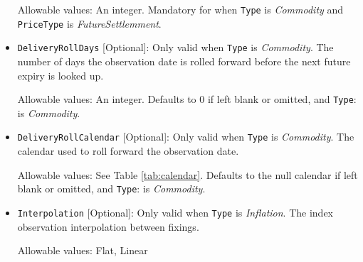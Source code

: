 \begin{itemize}
Allowable values:  An integer. Mandatory for when  \lstinline!Type! is  \emph{Commodity} and \lstinline!PriceType! is \emph{FutureSettlemment}.

\item \lstinline!DeliveryRollDays! [Optional]:
Only valid when  \lstinline!Type! is  \emph{Commodity}.  The number of days the observation date is rolled forward before the
  next future expiry is looked up.
  
Allowable values: An integer. Defaults to 0 if left blank or omitted, and \lstinline!Type!: is  \emph{Commodity}.

\item \lstinline!DeliveryRollCalendar! [Optional]:
Only valid when  \lstinline!Type! is  \emph{Commodity}.  The calendar used to roll forward the observation date.

Allowable values: See Table \ref{tab:calendar}. Defaults to the null calendar if left blank or omitted, and \lstinline!Type!: is  \emph{Commodity}.

\item \lstinline!Interpolation! [Optional]:
Only valid when \lstinline!Type! is  \emph{Inflation}. The index observation interpolation between fixings.

Allowable values: Flat, Linear

\end{itemize}
